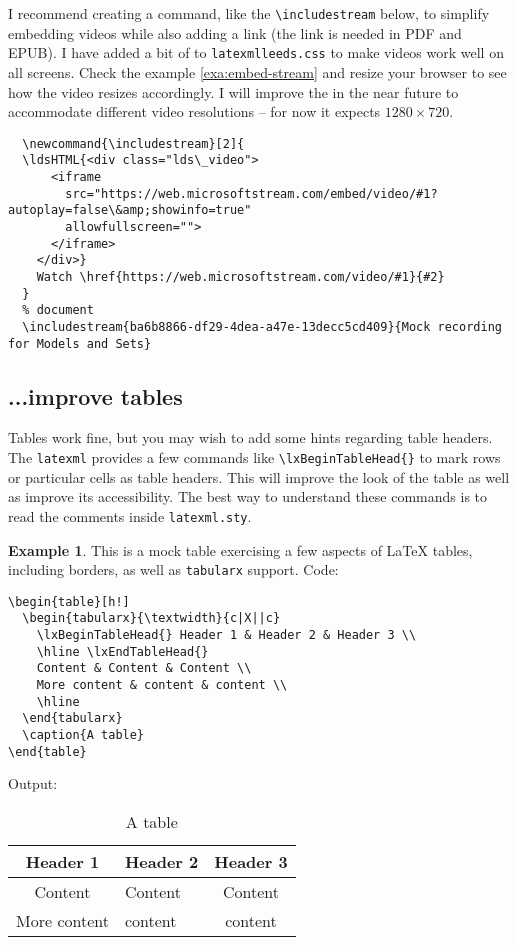 \documentclass[a4paper]{article}
\def\ltxinline{\lstinline[style=latexml]}
\theoremstyle{definition}
\newtheorem{exa}{Example}[subsection]
\begin{document}
I recommend creating a command, like the \ltxinline|\includestream| below, to simplify embedding videos while also adding a link (the link is needed in PDF and EPUB). I have added a bit of \CSS{} to \verb|latexmlleeds.css| to make videos work well on all screens. Check the example \autoref{exa:embed-stream} and resize your browser to see how the video resizes accordingly. I will improve the \CSS{} in the near future to accommodate different video resolutions -- for now it expects $1280 \times 720$.
\begin{lstlisting}[style=latexml]
  % preamble
  \newcommand{\includestream}[2]{
  \ldsHTML{<div class="lds\_video">
      <iframe
        src="https://web.microsoftstream.com/embed/video/#1?autoplay=false\&amp;showinfo=true"
        allowfullscreen="">
      </iframe>
    </div>}
    Watch \href{https://web.microsoftstream.com/video/#1}{#2}
  }
  % document
  \includestream{ba6b8866-df29-4dea-a47e-13decc5cd409}{Mock recording for Models and Sets}
\end{lstlisting}

\subsection{...improve tables}
Tables work fine, but you may wish to add some hints regarding table headers. The \verb|latexml| provides a few commands like \ltxinline|\lxBeginTableHead{}| to mark rows or particular cells as table headers. This will improve the look of the \HTML{} table as well as improve its accessibility. The best way to understand these commands is to read the comments inside \verb|latexml.sty|.

\begin{exa}
  This is a mock table exercising a few aspects of \LaTeX{} tables, including borders, as well as \verb|tabularx| support.
  Code:
  \begin{lstlisting}[style=latexml]
\begin{table}[h!]
  \begin{tabularx}{\textwidth}{c|X||c}
    \lxBeginTableHead{} Header 1 & Header 2 & Header 3 \\
    \hline \lxEndTableHead{}
    Content & Content & Content \\
    More content & content & content \\
    \hline
  \end{tabularx}
  \caption{A table}
\end{table}
  \end{lstlisting}
  Output:
  \begin{table}[h!]
    \begin{tabularx}{\textwidth}{c|X||c}
      \lxBeginTableHead{} Header 1 & Header 2 & Header 3 \\
      \hline \lxEndTableHead{}
      Content & Content & Content \\
      More content & content & content \\
      \hline
    \end{tabularx}
    \caption{A table}
  \end{table}
\end{exa}
\end{document}
